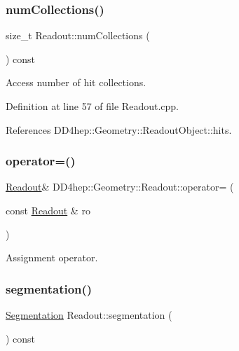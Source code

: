 \subsubsection{\texorpdfstring{num\+Collections()}{numCollections()}}
{\footnotesize\ttfamily size\+\_\+t Readout\+::num\+Collections (\begin{DoxyParamCaption}{ }\end{DoxyParamCaption}) const}



Access number of hit collections. 



Definition at line 57 of file Readout.\+cpp.



References D\+D4hep\+::\+Geometry\+::\+Readout\+Object\+::hits.

\hypertarget{class_d_d4hep_1_1_geometry_1_1_readout_a106fe642314da1da418c6b05be898939}{}\label{class_d_d4hep_1_1_geometry_1_1_readout_a106fe642314da1da418c6b05be898939} 
\subsubsection{\texorpdfstring{operator=()}{operator=()}}
{\footnotesize\ttfamily \hyperlink{class_d_d4hep_1_1_geometry_1_1_readout}{Readout}\& D\+D4hep\+::\+Geometry\+::\+Readout\+::operator= (\begin{DoxyParamCaption}\item[{const \hyperlink{class_d_d4hep_1_1_geometry_1_1_readout}{Readout} \&}]{ro }\end{DoxyParamCaption})\hspace{0.3cm}{\ttfamily [default]}}



Assignment operator. 

\hypertarget{class_d_d4hep_1_1_geometry_1_1_readout_ab6e80a6f84cef69b5b567fb46ece6fab}{}\label{class_d_d4hep_1_1_geometry_1_1_readout_ab6e80a6f84cef69b5b567fb46ece6fab} 
\subsubsection{\texorpdfstring{segmentation()}{segmentation()}}
{\footnotesize\ttfamily \hyperlink{class_d_d4hep_1_1_geometry_1_1_segmentation}{Segmentation} Readout\+::segmentation (\begin{DoxyParamCaption}{ }\end{DoxyParamCaption}) const}



